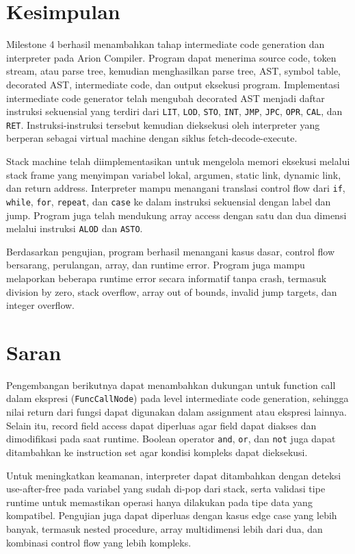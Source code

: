 \section{Kesimpulan}
Milestone 4 berhasil menambahkan tahap intermediate code generation dan interpreter pada Arion Compiler. Program dapat menerima source code, token stream, atau parse tree, kemudian menghasilkan parse tree, AST, symbol table, decorated AST, intermediate code, dan output eksekusi program. Implementasi intermediate code generator telah mengubah decorated AST menjadi daftar instruksi sekuensial yang terdiri dari \texttt{LIT}, \texttt{LOD}, \texttt{STO}, \texttt{INT}, \texttt{JMP}, \texttt{JPC}, \texttt{OPR}, \texttt{CAL}, dan \texttt{RET}. Instruksi-instruksi tersebut kemudian dieksekusi oleh interpreter yang berperan sebagai virtual machine dengan siklus fetch-decode-execute.

Stack machine telah diimplementasikan untuk mengelola memori eksekusi melalui stack frame yang menyimpan variabel lokal, argumen, static link, dynamic link, dan return address. Interpreter mampu menangani translasi control flow dari \texttt{if}, \texttt{while}, \texttt{for}, \texttt{repeat}, dan \texttt{case} ke dalam instruksi sekuensial dengan label dan jump. Program juga telah mendukung array access dengan satu dan dua dimensi melalui instruksi \texttt{ALOD} dan \texttt{ASTO}.

Berdasarkan pengujian, program berhasil menangani kasus dasar, control flow bersarang, perulangan, array, dan runtime error. Program juga mampu melaporkan beberapa runtime error secara informatif tanpa crash, termasuk division by zero, stack overflow, array out of bounds, invalid jump targets, dan integer overflow.

\section{Saran}
Pengembangan berikutnya dapat menambahkan dukungan untuk function call dalam ekspresi (\texttt{FuncCallNode}) pada level intermediate code generation, sehingga nilai return dari fungsi dapat digunakan dalam assignment atau ekspresi lainnya. Selain itu, record field access dapat diperluas agar field dapat diakses dan dimodifikasi pada saat runtime. Boolean operator \texttt{and}, \texttt{or}, dan \texttt{not} juga dapat ditambahkan ke instruction set agar kondisi kompleks dapat dieksekusi.

Untuk meningkatkan keamanan, interpreter dapat ditambahkan dengan deteksi use-after-free pada variabel yang sudah di-pop dari stack, serta validasi tipe runtime untuk memastikan operasi hanya dilakukan pada tipe data yang kompatibel. Pengujian juga dapat diperluas dengan kasus edge case yang lebih banyak, termasuk nested procedure, array multidimensi lebih dari dua, dan kombinasi control flow yang lebih kompleks.

